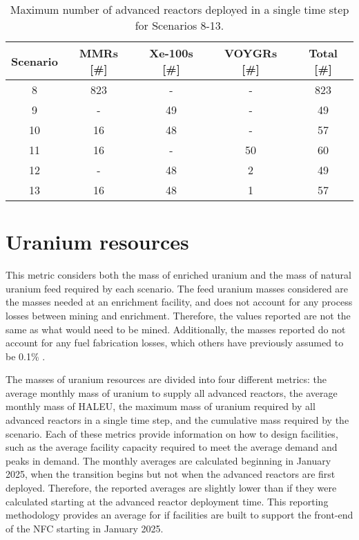 \begin{table}
    \centering 
    \caption{Maximum number of advanced reactors deployed in a single 
    time step for Scenarios 8-13.}
    \label{tab:reactors_added_1percent}
    \begin{tabular}{c c c c c}
        \hline
        Scenario & \glspl{MMR} [\#] & Xe-100s [\#] & VOYGRs [\#] 
        & Total [\#]\\\hline
        8 & 823 & - & - & 823\\
        9 & - & 49 & - & 49\\
        10 & 16 & 48 & - & 57\\
        11 & 16 & - & 50 & 60\\
        12 & - & 48 & 2 & 49\\
        13 & 16 & 48 & 1 & 57\\
        \hline
    \end{tabular}
\end{table}

\section{Uranium resources}
This metric considers  
both the mass of enriched uranium and the mass of natural uranium feed 
required by each scenario. The feed uranium masses 
considered are the masses needed at an enrichment facility,
and does not account for any process losses between mining and 
enrichment. Therefore, the values reported are not the same as what would 
need to be mined. Additionally, the masses reported do not account for 
any fuel fabrication losses, which others have previously assumed to 
be 0.1\% \cite{wigeland_nuclear_2014}. 

The masses of uranium resources are divided into four 
different metrics: the average monthly mass of uranium to supply all 
advanced reactors, the average monthly mass of \gls{HALEU}, the 
maximum mass of uranium required by all advanced 
reactors in a single time step, and the cumulative mass required by the 
scenario. Each of these metrics provide information 
on how to design facilities, such as the average facility capacity 
required to meet the average demand and peaks in demand. The monthly 
averages are calculated beginning in January 2025, 
when the transition begins but not when the advanced reactors 
are first deployed. Therefore, the reported averages are slightly lower 
than if they were calculated starting at the advanced reactor deployment 
time. This reporting methodology provides an average for if 
facilities are built to support the front-end of the \gls{NFC} starting 
in January 2025. 

